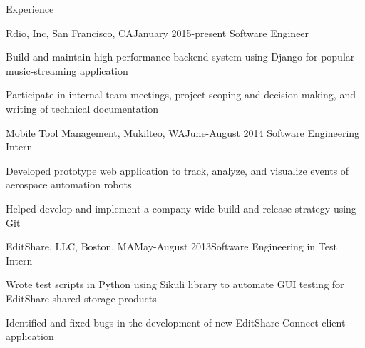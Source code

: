 \documentclass{resume} %
\begin{document}

\begin{rSection}{Experience}

\begin{rSubsection}{Rdio, Inc, San Francisco, CA}{January 2015-present} {Software Engineer}

\item Build and maintain high-performance backend system using Django for popular music-streaming application
\item Participate in internal team meetings, project scoping and decision-making, and writing of technical documentation
\end{rSubsection}

\begin{rSubsection}{Mobile Tool Management, Mukilteo, WA}{June-August 2014} {Software Engineering Intern} 

\item Developed prototype web application to track, analyze, and visualize events of aerospace automation robots
\item Helped develop and implement a company-wide build and release strategy using Git
\end{rSubsection}


\begin{rSubsection}{EditShare, LLC, Boston, MA}{May-August 2013}{Software Engineering in Test Intern}{}
\item Wrote test scripts in Python using Sikuli library to automate GUI testing for EditShare shared-storage products
\item Identified and fixed bugs in the development of new EditShare Connect client application
\end{rSubsection}

\end{rSection}

\end{document}
